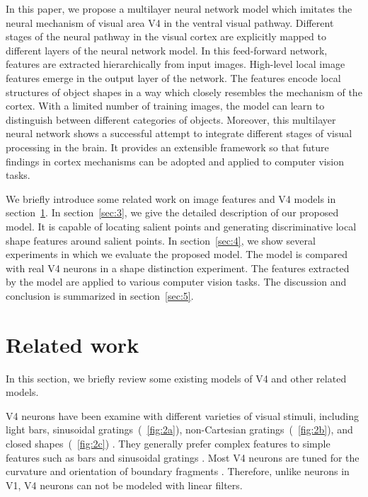 \documentclass[twocolumn]{article}
\begin{document}
In this paper, we propose a multilayer neural network model which imitates the neural mechanism of visual area V4 in the ventral visual pathway.
Different stages of the neural pathway in the visual cortex are explicitly mapped to different layers of the neural network model.
In this feed-forward network, features are extracted hierarchically from input images.
High-level local image features emerge in the output layer of the network. 
The features encode local structures of object shapes in a way which closely resembles the mechanism of the cortex.
With a limited number of training images, the model can learn to distinguish between different categories of objects.
Moreover, this multilayer neural network shows a successful attempt to integrate different stages of visual processing in the brain. 
It provides an extensible framework so that future findings in cortex mechanisms can be adopted and applied to computer vision tasks.

We briefly introduce some related work on image features and V4 models in section~\ref{sec:2}.
In section~\ref{sec:3}, we give the detailed description of our proposed model.
It is capable of locating salient points and generating discriminative local shape features around salient points.
In section~\ref{sec:4}, we show several experiments in which we evaluate the proposed model.
The model is compared with real V4 neurons in a shape distinction experiment.
The features extracted by the model are applied to various computer vision tasks.
The discussion and conclusion is summarized in section~\ref{sec:5}.

\section{Related work}\label{sec:2}

In this section, we briefly review some existing models of V4 and other related models.

V4 neurons have been examine with different varieties of visual stimuli, including light bars, sinusoidal gratings~(\figurename~\ref{fig:2a}),
non-Cartesian gratings~(\figurename~\ref{fig:2b}), and closed shapes~(\figurename~\ref{fig:2c}) \cite{gallant1996,pasupathy2001}.
They generally prefer complex features to simple features such as bars and sinusoidal gratings \cite{gallant1996}.
Most V4 neurons are tuned for the curvature and orientation of boundary fragments \cite{pasupathy2001}.
Therefore, unlike neurons in V1, V4 neurons can not be modeled with linear filters.
\end{document}
